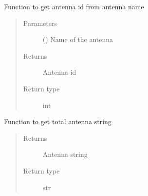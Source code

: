 \documentclass[letterpaper,10pt,english]{sphinxmanual}
\begin{document}
\begin{fulllineitems}

\begin{fulllineitems}
\label{\detokenize{paircars:paircars.access_ms.AccessMS.get_antenna_id}}
\sphinxAtStartPar
Function to get antenna id from antenna name
\begin{quote}\begin{description}
\item[{Parameters}] \leavevmode
\sphinxAtStartPar
{} () \textendash{} Name of the antenna

\item[{Returns}] \leavevmode
\sphinxAtStartPar
Antenna id

\item[{Return type}] \leavevmode
\sphinxAtStartPar
int

\end{description}\end{quote}

\end{fulllineitems}


\begin{fulllineitems}
\label{\detokenize{paircars:paircars.access_ms.AccessMS.get_antenna_string}}
\sphinxAtStartPar
Function to get total antenna string
\begin{quote}\begin{description}
\item[{Returns}] \leavevmode
\sphinxAtStartPar
Antenna string

\item[{Return type}] \leavevmode
\sphinxAtStartPar
str

\end{description}\end{quote}

\end{fulllineitems}


\end{fulllineitems}
\end{document}
